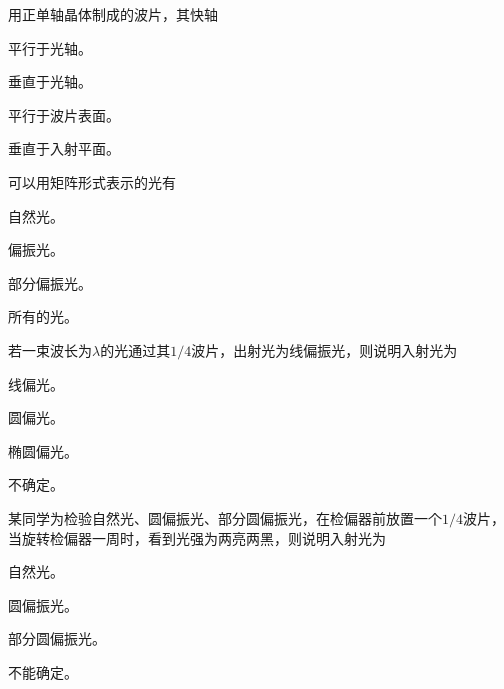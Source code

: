 \documentclass[padl, analysis, notocnum]{ExBook}
\newcommand{\answerarea}[1][3.5cm]{%
  \par\vspace{1mm}%
  \noindent{\color{themeColor!35}\rule{\linewidth}{0.4pt}}\par
  \noindent\begin{minipage}[t][#1][t]{\linewidth}\vspace{0pt}\end{minipage}\par
  \noindent{\color{themeColor!35}\rule{\linewidth}{0.4pt}}\par
}
\begin{document}
\begin{qitems}[startnum=10]
\qitem 用正单轴晶体制成的波片，其快轴
\par\noindent\hspace{2em}平行于光轴。
\par\noindent\hspace{2em}垂直于光轴。
\par\noindent\hspace{2em}平行于波片表面。
\par\noindent\hspace{2em}垂直于入射平面。
\label{q:309:start}
\answerarea[4.0cm]
\label{q:309:end}
\end{qitems}

\begin{qitems}[startnum=11]
\qitem 可以用矩阵形式表示的光有
\par\noindent\hspace{2em}自然光。
\par\noindent\hspace{2em}偏振光。
\par\noindent\hspace{2em}部分偏振光。
\par\noindent\hspace{2em}所有的光。
\label{q:310:start}
\answerarea[4.0cm]
\label{q:310:end}
\end{qitems}

\begin{qitems}[startnum=12]
\qitem 若一束波长为$\lambda$的光通过其$1/4$波片，出射光为线偏振光，则说明入射光为
\par\noindent\hspace{2em}线偏光。
\par\noindent\hspace{2em}圆偏光。
\par\noindent\hspace{2em}椭圆偏光。
\par\noindent\hspace{2em}不确定。
\label{q:311:start}
\answerarea[4.0cm]
\label{q:311:end}
\end{qitems}

\begin{qitems}[startnum=13]
\qitem 某同学为检验自然光、圆偏振光、部分圆偏振光，在检偏器前放置一个$1/4$波片，当旋转检偏器一周时，看到光强为两亮两黑，则说明入射光为
\par\noindent\hspace{2em}自然光。
\par\noindent\hspace{2em}圆偏振光。
\par\noindent\hspace{2em}部分圆偏振光。
\par\noindent\hspace{2em}不能确定。
\label{q:312:start}
\answerarea[4.0cm]
\label{q:312:end}
\end{qitems}
\end{document}
